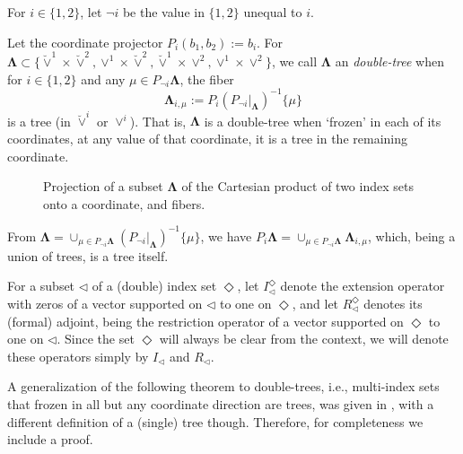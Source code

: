\documentclass{amsart}
\theoremstyle{definition}
\theoremstyle{remark}
\numberwithin{equation}{section}
\newcommand{\rem}[1]{{\color{blue}{[#1]}}}
\newcommand{\1}{\mathbb 1}
\newcommand{\tria}{{\mathcal T}}
\begin{document}
For $i \in \{1,2\}$, let $\neg i$ be the value in $\{1,2\}$ unequal to $i$.

Let the coordinate projector $P_i (b_1,b_2):=b_i$. \rem{In our setting, it seems best when first coordinate corresponds to the temporal spaces, and the second coordinate corresponds to the spatial spaces.} For $\bm{\Lambda} \subset \{\breve{\vee}^{1} \times \breve{\vee}^2,\vee^1 \times \breve{\vee}^2, \breve{\vee}^1 \times \vee^2, \vee^1 \times \vee^2\}$, we call $\bm{\Lambda}$ an {\em double-tree} when for $i \in \{1,2\}$ and any $\mu\in P_{\lnot i}\bm{\Lambda}$, the fiber
$$
\bm{\Lambda}_{i,\mu}:=P_i(P_{\lnot i}|_{\bm{\Lambda}})^{-1} \{\mu\}
$$
is a tree (in $\breve{\vee}^i $ or $\vee^i$). That is, $\bm{\Lambda}$ is a double-tree when `frozen' in each of its coordinates, at any value of that coordinate, it is a tree in the remaining coordinate.

\rem{$X^\delta=\sum_{\lambda \in \vee_\Sigma} \sigma_\lambda \otimes \tilde{W}_\lambda^\delta$ is a multi-tree iff $\tilde{W}_\lambda^\delta \subset \tilde{W}_\mu^\delta$ whenever $\mu$ is parent of $\lambda$, and each $\tilde{W}_\lambda^\delta$ is either $\{0\}$ or a fem space w.r.t. conforming NVB partition (with fixed $\tria_\bot$).}

\begin{figure}
\begin{center}

\end{center}
\caption{Projection of a subset $\bm{\Lambda}$ of the Cartesian product of two index sets onto a coordinate, and fibers.}
\end{figure}

From $\bm{\Lambda}=\cup_{\mu\in P_{\lnot i}\bm{\Lambda}} (P_{\lnot i}|_{\bm{\Lambda}})^{-1} \{\mu\}$, we have 
$P_i \bm{\Lambda}=\cup_{\mu\in P_{\lnot i}\bm{\Lambda}} \bm{\Lambda}_{i,\mu}$, which, being a union of trees, is a tree itself.

For a subset $\lhd$ of a (double) index set $\Diamond$, let $I_\lhd^\Diamond$ denote the extension operator with zeros of a vector supported on $\lhd$ to one on $\Diamond$, and let $R_\lhd^\Diamond$ denotes its (formal) adjoint, being the restriction operator of a vector supported on $\Diamond$ to one on $\lhd$. Since the set $\Diamond$ will always be clear from the context, we will denote these operators simply by $I_\lhd$ and $R_\lhd$.%

A generalization of the following theorem to double-trees, i.e., multi-index sets that frozen in all but any coordinate direction are trees, was given in \cite[Thm.~3.1]{171.7}, with a different definition of a (single) tree though.
Therefore, for completeness we include a proof.
\end{document}

